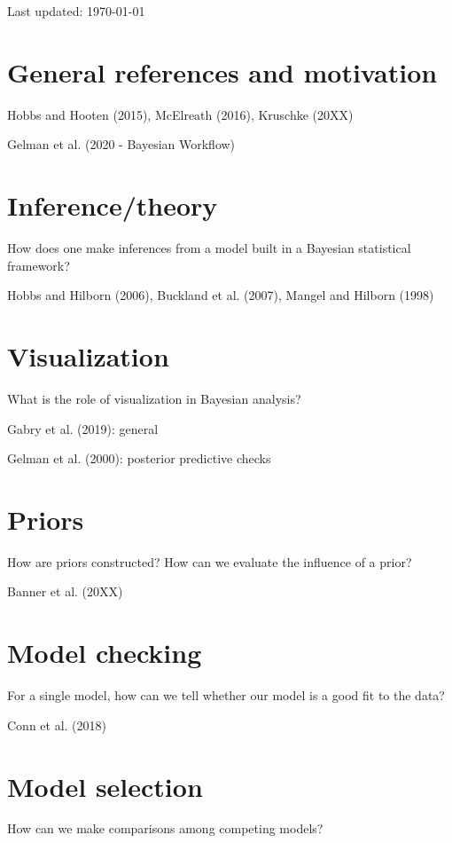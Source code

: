 \documentclass[12pt, oneside, titlepage]{article}   	%
\begin{document}
 

Last updated: \today

\section*{General references and motivation}

Hobbs and Hooten (2015), McElreath (2016), Kruschke (20XX)

Gelman et al. (2020 - Bayesian Workflow)

\section*{Inference/theory}

How does one make inferences from a model built in a Bayesian statistical framework?

Hobbs and Hilborn (2006), Buckland et al. (2007), Mangel and Hilborn (1998)

\section*{Visualization}

What is the role of visualization in Bayesian analysis? 

Gabry et al. (2019): general

Gelman et al. (2000): posterior predictive checks

\section*{Priors}

How are priors constructed? How can we evaluate the influence of a prior?

Banner et al. (20XX)

\section*{Model checking}

For a single model, how can we tell whether our model is a good fit to the data?

Conn et al. (2018)

\section*{Model selection}

How can we make comparisons among competing models?
\end{document}
